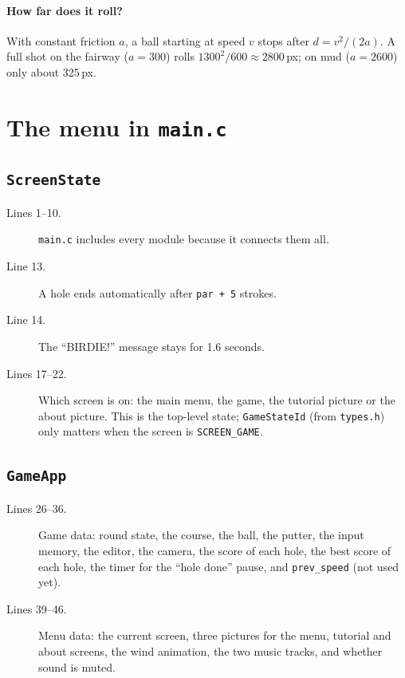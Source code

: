 \documentclass[11pt,a4paper]{article}
\newcommand{\code}[3]{}
\begin{document}
\paragraph{How far does it roll?} With constant friction $a$, a ball starting at speed $v$ stops after
$d = v^2/(2a)$. A full shot on the fairway ($a=300$) rolls $1300^2/600 \approx 2800$\,px; on mud ($a=2600$) only
about 325\,px.

\section{The menu in \texttt{main.c}}\label{sec:menu}

\subsection{\texttt{ScreenState}}

\code{main.c}{1}{22}

\begin{description}
  \item[Lines 1--10.] \texttt{main.c} includes every module because it connects them all.
  \item[Line 13.] A hole ends automatically after \texttt{par + 5} strokes.
  \item[Line 14.] The ``BIRDIE!'' message stays for 1.6 seconds.
  \item[Lines 17--22.] Which screen is on: the main menu, the game, the tutorial picture or the about picture. This is
  the top-level state; \texttt{GameStateId} (from \texttt{types.h}) only matters when the screen is
  \texttt{SCREEN\_GAME}.
\end{description}

\subsection{\texttt{GameApp}}\label{sec:gameapp}

\code{main.c}{25}{47}

\begin{description}
  \item[Lines 26--36.] Game data: round state, the course, the ball, the putter, the input memory, the editor, the
  camera, the score of each hole, the best score of each hole, the timer for the ``hole done'' pause, and
  \texttt{prev\_speed} (not used yet).
  \item[Lines 39--46.] Menu data: the current screen, three pictures for the menu, tutorial and about screens, the
  wind animation, the two music tracks, and whether sound is muted.
\end{description}
\end{document}
